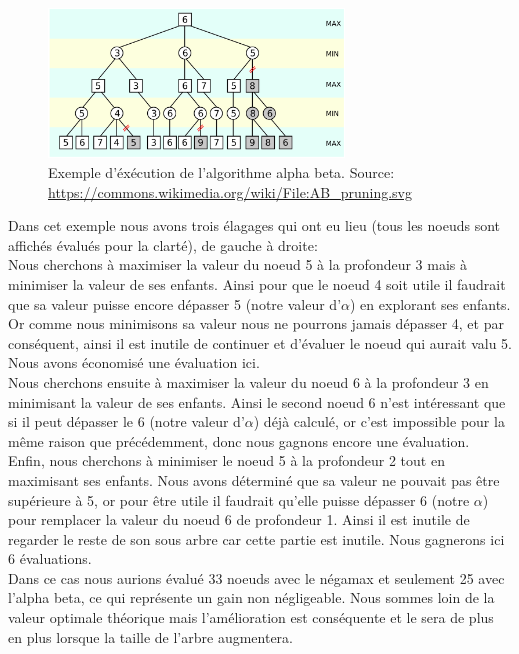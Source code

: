 \documentclass{article}
\begin{document}
\begin{figure}[!hbt]
		\centering
	\includegraphics[width=0.7\textwidth]{ab.png}
		\caption{Exemple d'éxécution de l'algorithme alpha beta. Source: \url{https://commons.wikimedia.org/wiki/File:AB\_pruning.svg}}
\end{figure}

Dans cet exemple nous avons trois élagages qui ont eu lieu (tous les noeuds sont affichés évalués pour la clarté), de gauche à droite:\\
Nous cherchons à maximiser la valeur du noeud 5 à la profondeur 3 mais à minimiser la valeur de ses enfants.
Ainsi pour que le noeud 4 soit utile il faudrait que sa valeur puisse encore dépasser 5 (notre valeur d'$\alpha$) en explorant ses enfants. Or comme nous minimisons
sa valeur nous ne pourrons jamais dépasser 4, et par conséquent, ainsi il est inutile de continuer et d'évaluer le noeud qui aurait valu 5.
Nous avons économisé une évaluation ici.\\
Nous cherchons ensuite à maximiser la valeur du noeud 6 à la profondeur 3 en minimisant la valeur de ses enfants.
Ainsi le second noeud 6 n'est intéressant que si il peut dépasser le 6 (notre valeur d'$\alpha$) déjà calculé, or c'est impossible pour la même raison
que précédemment, donc nous gagnons encore une évaluation.\\
Enfin, nous cherchons à minimiser le noeud 5 à la profondeur 2 tout en maximisant ses enfants.
Nous avons déterminé que sa valeur ne pouvait pas être supérieure à 5, or pour être utile il faudrait qu'elle puisse dépasser 6 (notre $\alpha$) pour 
remplacer la valeur du noeud 6 de profondeur 1. Ainsi il est inutile de regarder le reste de son sous arbre car cette partie est inutile.
Nous gagnerons ici 6 évaluations.\\
Dans ce cas nous aurions évalué 33 noeuds avec le négamax et seulement 25 avec l'alpha beta, ce qui représente un gain non négligeable. Nous sommes loin 
de la valeur optimale théorique mais l'amélioration est conséquente et le sera de plus en plus lorsque la taille de l'arbre augmentera. \\
\end{document}
